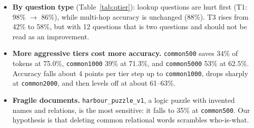 \documentclass[11pt]{article}
\newcommand{\code}[1]{\texttt{#1}}
\begin{document}
\begin{itemize}
\begin{itemize}
                \code{harbour} puzzle (\code{379 berths} instead of \code{9 berths}, \code{17 berths}
                instead of \code{16 berths}) and a wrong entity on \code{dwh} (\code{Corexit EC9527A}
                instead of \code{Port Bonython oil spill}).
          \item \emph{Gained} (5): questions the baseline got wrong. For example, the baseline answered
                \code{\$25 million} where \code{curated} gave the correct \code{\$45 million}, and
                \code{curated} gave the correct count of 5 where the baseline said 4. These gains most
                likely reflect the model's sensitivity to small input changes rather than a benefit of
                compression.
        \end{itemize}
  \item \textbf{By question type} (Table~\ref{tab:qtier}): lookup questions are hurt first
        (T1: 98\% $\to$ 86\%), while multi-hop accuracy is unchanged (88\%). T3 rises from 42\% to
        58\%, but with 12 questions that is two questions and should not be read as an improvement.
  \item \textbf{More aggressive tiers cost more accuracy.} \code{common500} saves 34\% of tokens at
        75.0\%, \code{common1000} 39\% at 71.3\%, and \code{common5000} 53\% at 62.5\%. Accuracy falls
        about 4 points per tier step up to \code{common1000}, drops sharply at \code{common2000}, and
        then levels off at about 61--63\%.
  \item \textbf{Fragile documents.} \code{harbour\_puzzle\_v1}, a logic puzzle with invented names
        and relations, is the most sensitive: it falls to 35\% at \code{common500}. Our hypothesis
        is that deleting common relational words scrambles who-is-what.
\end{itemize}

\end{document}
